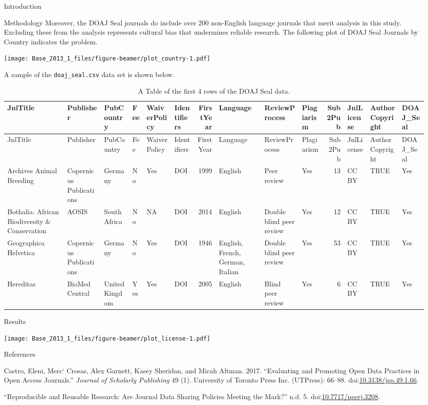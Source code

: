 \documentclass[ignorenonframetext,]{beamer}
\begin{document}
\begin{frame}[fragile]{Introduction}
\begin{block}{Methodology}
Moreover, the DOAJ Seal journals do include over 200 non-English
language journals that merit analysis in this study. Excluding these
from the analysis represents cultural bias that undermines reliable
research. The following plot of DOAJ Seal Journals by Country indicates
the problem.

\texttt{[image: Base\_2013\_1\_files/figure-beamer/plot\_country-1.pdf]}

A sample of the \texttt{doaj\_seal.csv} data set is shown below.

\begin{longtable}[]{@{}llllllrlllrlll@{}}
\caption{A Table of the first 4 rows of the DOAJ Seal
data.}\tabularnewline
\toprule
JnlTitle & Publisher & PubCountry & Fee & WaiverPolicy & Identifiers &
FirstYear & Language & ReviewProcess & Plagiarism & Sub2Pub & JnlLicense
& AuthorCopyright & DOAJ\_Seal\tabularnewline
\midrule
\endfirsthead
\toprule
JnlTitle & Publisher & PubCountry & Fee & WaiverPolicy & Identifiers &
FirstYear & Language & ReviewProcess & Plagiarism & Sub2Pub & JnlLicense
& AuthorCopyright & DOAJ\_Seal\tabularnewline
\midrule
\endhead
Archives Animal Breeding & Copernicus Publications & Germany & No & Yes
& DOI & 1999 & English & Peer review & Yes & 13 & CC BY & TRUE &
Yes\tabularnewline
Bothalia: African Biodiversity \& Conservation & AOSIS & South Africa &
No & NA & DOI & 2014 & English & Double blind peer review & Yes & 12 &
CC BY & TRUE & Yes\tabularnewline
Geographica Helvetica & Copernicus Publications & Germany & No & Yes &
DOI & 1946 & English, French, German, Italian & Double blind peer review
& Yes & 53 & CC BY & TRUE & Yes\tabularnewline
Hereditas & BioMed Central & United Kingdom & Yes & Yes & DOI & 2005 &
English & Blind peer review & Yes & 6 & CC BY & TRUE &
Yes\tabularnewline
\bottomrule
\end{longtable}

\end{block}

\end{frame}

\begin{frame}{Results}

\texttt{[image: Base\_2013\_1\_files/figure-beamer/plot\_license-1.pdf]}

\end{frame}

\begin{frame}{References}

\hypertarget{refs}{}
\hypertarget{ref-Castro_2017}{}
Castro, Eleni, Merc\e` Crosas, Alex Garnett, Kasey Sheridan, and Micah
Altman. 2017. ``Evaluating and Promoting Open Data Practices in Open
Access Journals.'' \emph{Journal of Scholarly Publishing} 49 (1).
University of Toronto Press Inc. (UTPress): 66--88.
doi:\href{https://doi.org/10.3138/jsp.49.1.66}{10.3138/jsp.49.1.66}.

\hypertarget{ref-Vasilevsky_2017}{}
``Reproducible and Reusable Research: Are Journal Data Sharing Policies
Meeting the Mark?'' n.d. 5.
doi:\href{https://doi.org/10.7717/peerj.3208}{10.7717/peerj.3208}.

\end{frame}
\end{document}
